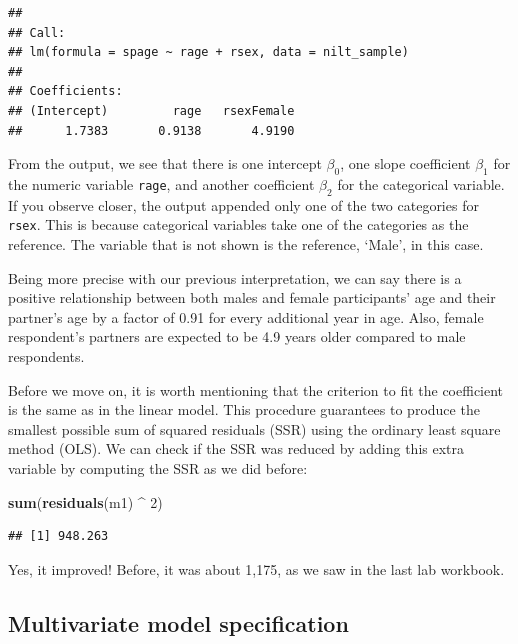 \documentclass[
]{book}
\newenvironment{Shaded}{\begin{snugshade}}{\end{snugshade}}
\newcommand{\DecValTok}[1]{\textcolor[rgb]{0.00,0.00,0.81}{#1}}
\newcommand{\FunctionTok}[1]{\textcolor[rgb]{0.13,0.29,0.53}{\textbf{#1}}}
\newcommand{\NormalTok}[1]{#1}
\newcommand{\SpecialCharTok}[1]{\textcolor[rgb]{0.81,0.36,0.00}{\textbf{#1}}}
\begin{document}
\begin{verbatim}
## 
## Call:
## lm(formula = spage ~ rage + rsex, data = nilt_sample)
## 
## Coefficients:
## (Intercept)         rage   rsexFemale  
##      1.7383       0.9138       4.9190
\end{verbatim}

From the output, we see that there is one intercept \(\beta_0\), one slope coefficient \(\beta_1\) for the numeric variable \texttt{rage}, and another coefficient \(\beta_2\) for the categorical variable. If you observe closer, the output appended only one of the two categories for \texttt{rsex}. This is because categorical variables take one of the categories as the reference. The variable that is not shown is the reference, `Male', in this case.

Being more precise with our previous interpretation, we can say there is a positive relationship between both males and female participants' age and their partner's age by a factor of 0.91 for every additional year in age. Also, female respondent's partners are expected to be 4.9 years older compared to male respondents.

Before we move on, it is worth mentioning that the criterion to fit the coefficient is the same as in the linear model. This procedure guarantees to produce the smallest possible sum of squared residuals (SSR) using the ordinary least square method (OLS). We can check if the SSR was reduced by adding this extra variable by computing the SSR as we did before:

\begin{Shaded}
\begin{Highlighting}[]
\FunctionTok{sum}\NormalTok{(}\FunctionTok{residuals}\NormalTok{(m1) }\SpecialCharTok{\^{}} \DecValTok{2}\NormalTok{)}
\end{Highlighting}
\end{Shaded}

\begin{verbatim}
## [1] 948.263
\end{verbatim}

Yes, it improved! Before, it was about 1,175, as we saw in the last lab workbook.

\hypertarget{multivariate-model-specification}{%
\subsection{Multivariate model specification}\label{multivariate-model-specification}}
\end{document}
